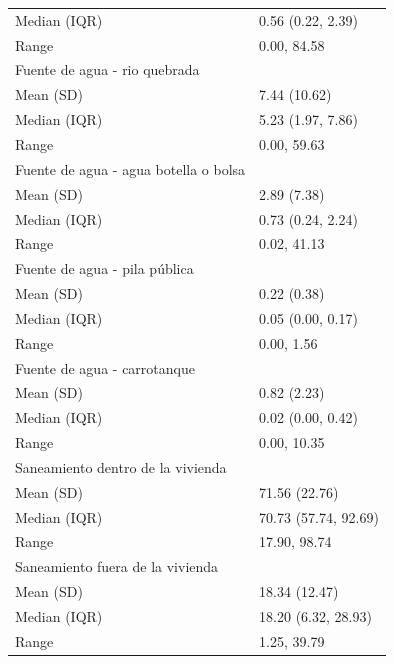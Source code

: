 \begin{table}
\begin{tabular}{ll}
\hspace{1em}Median (IQR) & 0.56 (0.22, 2.39)\\
\hspace{1em}Range & 0.00, 84.58\\
Fuente de agua - rio quebrada & \\
\addlinespace
\hspace{1em}Mean (SD) & 7.44 (10.62)\\
\hspace{1em}Median (IQR) & 5.23 (1.97, 7.86)\\
\hspace{1em}Range & 0.00, 59.63\\
Fuente de agua - agua botella o bolsa & \\
\hspace{1em}Mean (SD) & 2.89 (7.38)\\
\addlinespace
\hspace{1em}Median (IQR) & 0.73 (0.24, 2.24)\\
\hspace{1em}Range & 0.02, 41.13\\
Fuente de agua - pila pública & \\
\hspace{1em}Mean (SD) & 0.22 (0.38)\\
\hspace{1em}Median (IQR) & 0.05 (0.00, 0.17)\\
\addlinespace
\hspace{1em}Range & 0.00, 1.56\\
Fuente de agua - carrotanque & \\
\hspace{1em}Mean (SD) & 0.82 (2.23)\\
\hspace{1em}Median (IQR) & 0.02 (0.00, 0.42)\\
\hspace{1em}Range & 0.00, 10.35\\
\addlinespace
Saneamiento dentro de la vivienda & \\
\hspace{1em}Mean (SD) & 71.56 (22.76)\\
\hspace{1em}Median (IQR) & 70.73 (57.74, 92.69)\\
\hspace{1em}Range & 17.90, 98.74\\
Saneamiento fuera de la vivienda & \\
\addlinespace
\hspace{1em}Mean (SD) & 18.34 (12.47)\\
\hspace{1em}Median (IQR) & 18.20 (6.32, 28.93)\\
\hspace{1em}Range & 1.25, 39.79\\
\bottomrule
\end{tabular}
\endgroup{}
\end{table}

